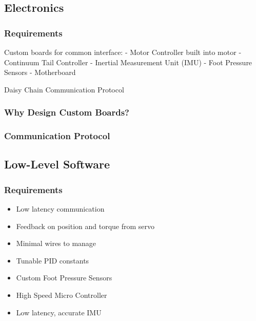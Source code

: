     \subsection{Electronics}
        \subsubsection{Requirements}
            \begin{Deliverables}
                \item Custom boards for common interface:
                \subitem - Motor Controller built into motor
                \subitem - Continuum Tail Controller
                \subitem - Inertial Measurement Unit (IMU)
                \subitem - Foot Pressure Sensors
                \subitem - Motherboard
                \item Daisy Chain Communication Protocol
            \end{Deliverables}
        
        \subsubsection{Why Design Custom Boards?}

        \subsubsection{Communication Protocol}


    \subsection{Low-Level Software}
    \subsubsection{Requirements}
    \begin{itemize} %
        \item Low latency communication
        \item Feedback on position and torque from servo
        \item Minimal wires to manage
        \item Tunable PID constants
        \item Custom Foot Pressure Sensors
        \item High Speed Micro Controller
        \item Low latency, accurate IMU
    \end{itemize}

